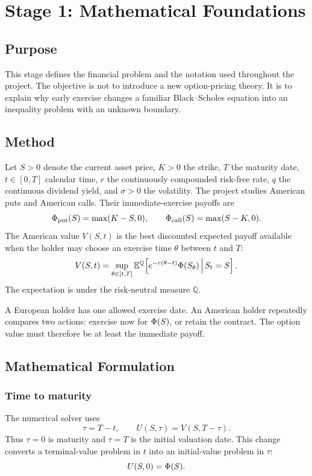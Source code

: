 \section{Stage 1: Mathematical Foundations}

\subsection{Purpose}
This stage defines the financial problem and the notation used throughout the
project. The objective is not to introduce a new option-pricing theory. It is
to explain why early exercise changes a familiar Black--Scholes equation into
an inequality problem with an unknown boundary.

\subsection{Method}
Let \(S>0\) denote the current asset price, \(K>0\) the strike, \(T\) the
maturity date, \(t\in[0,T]\) calendar time, \(r\) the continuously compounded
risk-free rate, \(q\) the continuous dividend yield, and \(\sigma>0\) the
volatility. The project studies American puts and American calls. Their
immediate-exercise payoffs are
\[
  \Phi_{\mathrm{put}}(S)=\max(K-S,0),
  \qquad
  \Phi_{\mathrm{call}}(S)=\max(S-K,0).
\]
The American value \(V(S,t)\) is the best discounted expected payoff available
when the holder may choose an exercise time \(\theta\) between \(t\) and \(T\):
\[
  V(S,t)
  =
  \sup_{\theta\in[t,T]}
  \mathbb{E}^{\mathbb{Q}}\!
  \left[
    e^{-r(\theta-t)}\Phi(S_\theta)
    \,\middle|\,S_t=S
  \right].
\]
The expectation is under the risk-neutral measure \(\mathbb{Q}\).

\begin{readerintuition}
A European holder has one allowed exercise date. An American holder repeatedly
compares two actions: exercise now for \(\Phi(S)\), or retain the contract.
The option value must therefore be at least the immediate payoff.
\end{readerintuition}

\subsection{Mathematical Formulation}
\subsubsection{Time to maturity}
The numerical solver uses
\[
  \tau=T-t,
  \qquad
  U(S,\tau)=V(S,T-\tau).
\]
Thus \(\tau=0\) is maturity and \(\tau=T\) is the initial valuation date. This
change converts a terminal-value problem in \(t\) into an initial-value problem
in \(\tau\):
\[
  U(S,0)=\Phi(S).
\]

